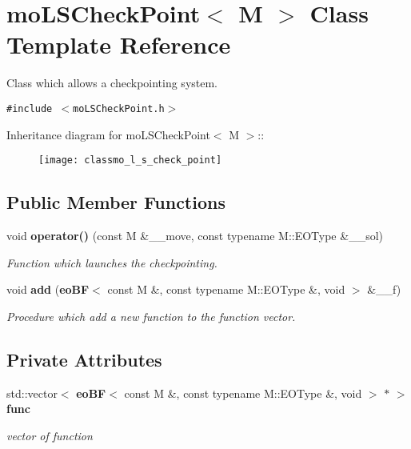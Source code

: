 \section{mo\-LSCheck\-Point$<$ M $>$ Class Template Reference}
\label{classmo_l_s_check_point}
Class which allows a checkpointing system.  


{\tt \#include $<$mo\-LSCheck\-Point.h$>$}

Inheritance diagram for mo\-LSCheck\-Point$<$ M $>$::\begin{figure}[H]
\begin{center}
\leavevmode
\texttt{[image: classmo\_l\_s\_check\_point]}
\end{center}
\end{figure}
\subsection*{Public Member Functions}
\begin{CompactItemize}
\item 
void {\bf operator()} (const M \&\_\-\_\-move, const typename M::EOType \&\_\-\_\-sol)
\begin{CompactList}\small\item\em Function which launches the checkpointing. \item\end{CompactList}\item 
void {\bf add} ({\bf eo\-BF}$<$ const M \&, const typename M::EOType \&, void $>$ \&\_\-\_\-f)
\begin{CompactList}\small\item\em Procedure which add a new function to the function vector. \item\end{CompactList}\end{CompactItemize}
\subsection*{Private Attributes}
\begin{CompactItemize}
\item 
std::vector$<$ {\bf eo\-BF}$<$ const M \&, const typename M::EOType \&, void $>$ $\ast$ $>$ {\bf func}\label{classmo_l_s_check_point_ff2a31ee5689a804bd9a572c51a36ca4}

\begin{CompactList}\small\item\em vector of function \item\end{CompactList}\end{CompactItemize}


